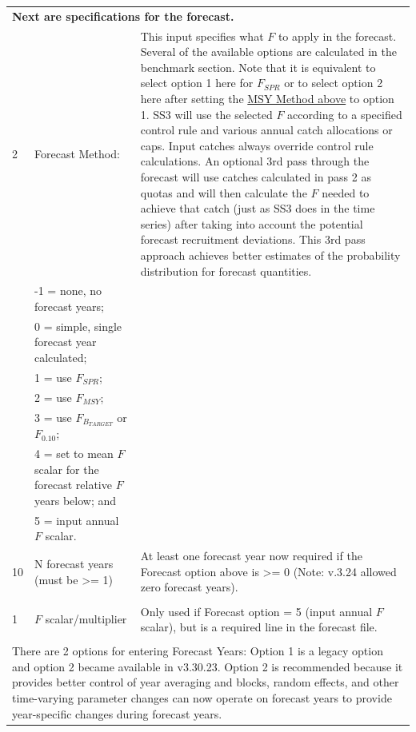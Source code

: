 \begin{landscape}
{\begin{longtable}{p{2cm} p{7cm} p{12cm}}
  \hline
  \multicolumn{3}{l}{\textbf{Next are specifications for the forecast.}} \\
  2 & \hypertarget{Fcast}{Forecast Method:} & \multirow{1}{1cm}[-0.25cm]{\parbox{12cm}{This input specifies what $F$ to apply in the forecast. Several of the available options are calculated in the benchmark section. Note that it is equivalent to select option 1 here for $F_{SPR}$ or to select option 2 here after setting the \hyperlink{MSYMethod}{MSY Method above} to option 1. SS3 will use the selected $F$ according to a specified control rule and various annual catch allocations or caps. Input catches always override control rule calculations. An optional 3rd pass through the forecast will use catches calculated in pass 2 as quotas and will then calculate the $F$ needed to achieve that catch (just as SS3 does in the time series) after taking into account the potential forecast recruitment deviations. This 3rd pass approach achieves better estimates of the probability distribution for forecast quantities.}} \Tstrut\\
    & -1 = none, no forecast years; & \\
    & 0 = simple, single forecast year calculated; & \\
    & 1 = use $F_{SPR}$; & \\
    & 2 = use $F_{MSY}$; & \\
    & 3 = use $F_{B_{TARGET}}$ or $F_{0.10}$; & \\
    & 4 = set to mean $F$ scalar for the forecast relative $F$ years below; and & \\
    & 5 = input annual $F$ scalar. & \Bstrut\\

  \hline
  10 & N forecast years (must be >= 1) & \multirow{1}{1cm}[-0.15cm]{\parbox{12cm}{At least one forecast year now required if the Forecast option above is >= 0 (Note: v.3.24 allowed zero forecast years).}} \Tstrut\\
    & & \\

  \hline
  1 & $F$ scalar/multiplier & \multirow{1}{1cm}[-0.15cm]{\parbox{12cm}{Only used if Forecast option = 5 (input annual $F$ scalar), but is a required line in the forecast file.}} \Tstrut\\
    & & \\
  
  \hline
  \multicolumn{3}{l}{There are 2 options for entering \hypertarget{FcastYears}{Forecast Years}: Option 1 is a legacy option and option 2 became available in v3.30.23. Option 2 is recommended because it provides better control of year averaging and blocks, random effects, and other time-varying parameter changes can now operate on forecast years to provide year-specific changes during forecast years.} \Tstrut\Bstrut\\
  

\end{longtable}}
\end{landscape}
